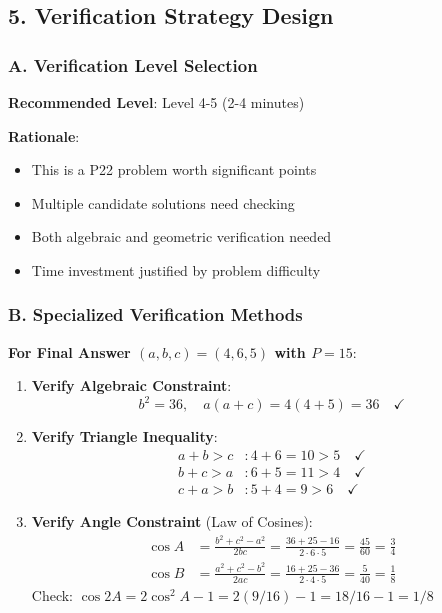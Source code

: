 \documentclass[12pt]{article}
\begin{document}
\begin{verificationbox}
\subsection*{5. Verification Strategy Design}

\subsubsection*{A. Verification Level Selection}

\textbf{Recommended Level}: Level 4-5 (2-4 minutes)

\textbf{Rationale}:
\begin{itemize}
    \item This is a P22 problem worth significant points
    \item Multiple candidate solutions need checking
    \item Both algebraic and geometric verification needed
    \item Time investment justified by problem difficulty
\end{itemize}

\subsubsection*{B. Specialized Verification Methods}

\textbf{For Final Answer $(a,b,c) = (4,6,5)$ with $P = 15$}:

\begin{enumerate}
    \item \textbf{Verify Algebraic Constraint}: 
    $$b^2 = 36, \quad a(a+c) = 4(4+5) = 36 \quad \checkmark$$
    
    \item \textbf{Verify Triangle Inequality}:
    \begin{align*}
    a + b > c &: 4 + 6 = 10 > 5 \quad \checkmark \\
    b + c > a &: 6 + 5 = 11 > 4 \quad \checkmark \\
    c + a > b &: 5 + 4 = 9 > 6 \quad \checkmark
    \end{align*}
    
    \item \textbf{Verify Angle Constraint} (Law of Cosines):
    \begin{align*}
    \cos A &= \frac{b^2+c^2-a^2}{2bc} = \frac{36+25-16}{2 \cdot 6 \cdot 5} = \frac{45}{60} = \frac{3}{4} \\
    \cos B &= \frac{a^2+c^2-b^2}{2ac} = \frac{16+25-36}{2 \cdot 4 \cdot 5} = \frac{5}{40} = \frac{1}{8}
    \end{align*}
    Check: $\cos 2A = 2\cos^2 A - 1 = 2(9/16) - 1 = 18/16 - 1 = 1/8$ \quad \checkmark
    

\end{enumerate}
\end{verificationbox}
\end{document}
